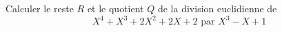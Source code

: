Calculer le reste $R$ et le quotient $Q$ de la division euclidienne de
\begin{displaymath}
 X^{4} + X^{3}+2 X^{2} + 2 X + 2 \text{ par } X^3-X+1
\end{displaymath}

\bigskip \bigskip